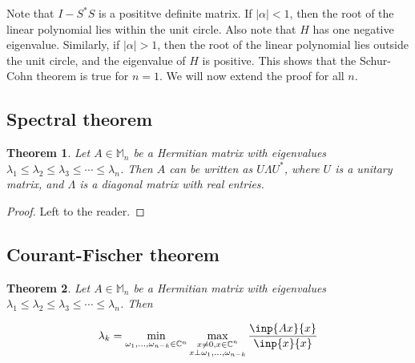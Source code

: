 \documentclass[twofold]{article}
\newcommand*\adj[1]{#1^*}
\newcommand*\abs[1]{\left \vert #1 \right\vert}
\theoremstyle{plain}
\newtheorem*{theorem}{Theorem}
\theoremstyle{definition}
\begin{document}
Note that \(I - \adj{S} S\) is a posititve definite matrix. If \(\abs{\alpha} < 1\), then the root of the linear polynomial lies within the unit circle. Also note that \(H\) has one negative eigenvalue. Similarly, if \(\abs{\alpha} > 1\), then the root of the linear polynomial lies outside the unit circle, and the eigenvalue of \(H\) is positive. This shows that the Schur-Cohn theorem is true for \(n = 1\). We will now extend the proof for all \(n\). 

\subsection{Spectral theorem}

\begin{theorem} Let \(A \in \mathbb{M}_n\) be a Hermitian matrix with eigenvalues \(\lambda_1 \le \lambda_2 \le \lambda_3 \le \cdots \le \lambda_n\). Then \(A\) can be written as \(U \Lambda \adj{U} \), where \(U\) is a unitary matrix, and \(\Lambda\) is a diagonal matrix with real entries. \end{theorem}

\begin{proof} Left to the reader. \end{proof}

\subsection{Courant-Fischer theorem}

\begin{theorem} Let \(A \in \mathbb{M}_n\) be a Hermitian matrix with eigenvalues \(\lambda_1 \le \lambda_2 \le \lambda_3 \le \cdots \le \lambda_n\). Then 

  \[ \lambda_k = \min_{\omega_1, \ldots , \omega_{n-k} \in \mathbb{C}^n} \max_{\substack{x \neq 0, x\in \mathbb{C}^n \\ x \perp \omega_1, \ldots , \omega_{n-k}}} \frac{\inp{Ax}{x}}{\inp{x}{x}}\]

 \end{theorem}
\end{document}
